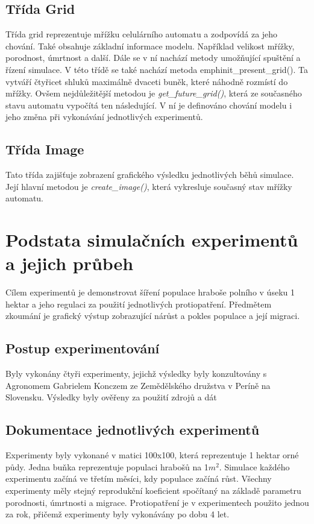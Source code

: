 \documentclass[a4paper,11pt]{article}
\begin{document}
\subsection{Třída Grid}
Třída grid reprezentuje mřížku celulárního automatu a zodpovídá za jeho chování. Také obsahuje základní informace modelu. Například velikost mřížky, porodnost, úmrtnost a další. Dále se v ní nachází metody umožňující spuštění a řízení simulace. V této třídě se také nachází metoda emph{init\_present\_grid()}. Ta vytváří čtyřicet shluků maximálně dvaceti buněk, které náhodně rozmístí do mřížky.
Ovšem nejdůležitější metodou je \emph{get\_future\_grid()}, která ze současného stavu automatu vypočítá ten následující. V ní je definováno chování modelu i jeho změna při vykonávání jednotlivých experimentů.

\subsection{Třída Image}
Tato třída zajišťuje zobrazení grafického výsledku jednotlivých běhů simulace. Její hlavní metodou je \emph{create\_image()}, která vykresluje současný stav mřížky automatu.


\section{Podstata simulačních experimentů a jejich průbeh}
Cílem experimentů je demonstrovat šíření populace hraboše polního v úseku 1 hektar a jeho regulaci za použití jednotlivých protiopatření. Předmětem zkoumání je grafický výstup zobrazující nárůst a pokles populace a její migraci. 
\subsection{Postup experimentování}
Byly vykonány čtyři experimenty, jejichž výsledky byly konzultovány s Agronomem Gabrielem Konczem ze Zemědělského družstva v Períně na Slovensku. Výsledky byly ověřeny za použití zdrojů a dát\cite{Voles-popul-data:online}
\subsection{Dokumentace jednotlivých experimentů}
Experimenty byly vykonané v matici 100x100, která reprezentuje 1 hektar orné půdy. Jedna buňka reprezentuje populaci hrabošů na 1$m^{2}$. Simulace každého experimentu začíná ve třetím měsíci, kdy populace začíná růst. Všechny experimenty měly stejný reprodukční koeficient spočítaný na základě parametru porodnosti, úmrtnosti a migrace. Protiopatření je v experimentech použito jednou za rok, přičemž experimenty byly vykonávány po dobu 4 let.
\end{document}
